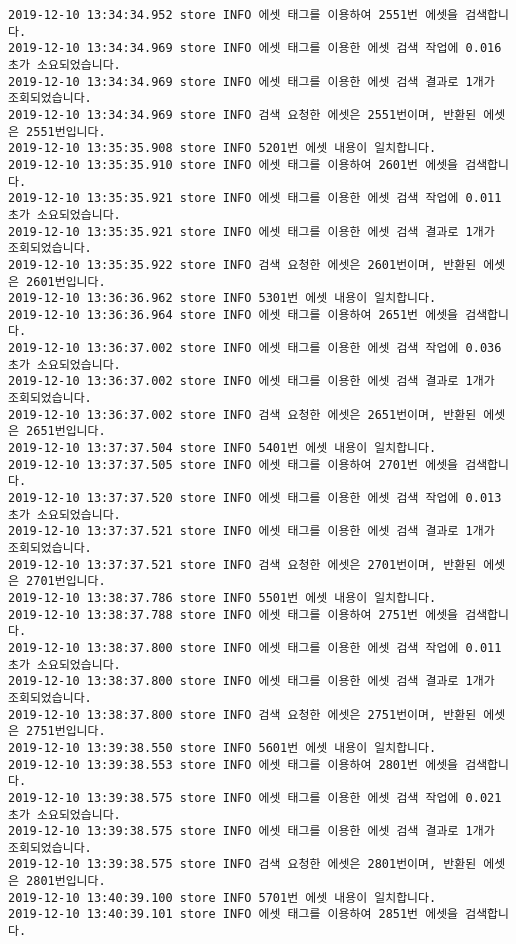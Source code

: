 \begin{Verbatim}[fontsize=\tiny, breaklines=true, breakanywhere=true]
2019-12-10 13:34:34.952 store INFO 에셋 태그를 이용하여 2551번 에셋을 검색합니다.
2019-12-10 13:34:34.969 store INFO 에셋 태그를 이용한 에셋 검색 작업에 0.016초가 소요되었습니다.
2019-12-10 13:34:34.969 store INFO 에셋 태그를 이용한 에셋 검색 결과로 1개가 조회되었습니다.
2019-12-10 13:34:34.969 store INFO 검색 요청한 에셋은 2551번이며, 반환된 에셋은 2551번입니다.
2019-12-10 13:35:35.908 store INFO 5201번 에셋 내용이 일치합니다.
2019-12-10 13:35:35.910 store INFO 에셋 태그를 이용하여 2601번 에셋을 검색합니다.
2019-12-10 13:35:35.921 store INFO 에셋 태그를 이용한 에셋 검색 작업에 0.011초가 소요되었습니다.
2019-12-10 13:35:35.921 store INFO 에셋 태그를 이용한 에셋 검색 결과로 1개가 조회되었습니다.
2019-12-10 13:35:35.922 store INFO 검색 요청한 에셋은 2601번이며, 반환된 에셋은 2601번입니다.
2019-12-10 13:36:36.962 store INFO 5301번 에셋 내용이 일치합니다.
2019-12-10 13:36:36.964 store INFO 에셋 태그를 이용하여 2651번 에셋을 검색합니다.
2019-12-10 13:36:37.002 store INFO 에셋 태그를 이용한 에셋 검색 작업에 0.036초가 소요되었습니다.
2019-12-10 13:36:37.002 store INFO 에셋 태그를 이용한 에셋 검색 결과로 1개가 조회되었습니다.
2019-12-10 13:36:37.002 store INFO 검색 요청한 에셋은 2651번이며, 반환된 에셋은 2651번입니다.
2019-12-10 13:37:37.504 store INFO 5401번 에셋 내용이 일치합니다.
2019-12-10 13:37:37.505 store INFO 에셋 태그를 이용하여 2701번 에셋을 검색합니다.
2019-12-10 13:37:37.520 store INFO 에셋 태그를 이용한 에셋 검색 작업에 0.013초가 소요되었습니다.
2019-12-10 13:37:37.521 store INFO 에셋 태그를 이용한 에셋 검색 결과로 1개가 조회되었습니다.
2019-12-10 13:37:37.521 store INFO 검색 요청한 에셋은 2701번이며, 반환된 에셋은 2701번입니다.
2019-12-10 13:38:37.786 store INFO 5501번 에셋 내용이 일치합니다.
2019-12-10 13:38:37.788 store INFO 에셋 태그를 이용하여 2751번 에셋을 검색합니다.
2019-12-10 13:38:37.800 store INFO 에셋 태그를 이용한 에셋 검색 작업에 0.011초가 소요되었습니다.
2019-12-10 13:38:37.800 store INFO 에셋 태그를 이용한 에셋 검색 결과로 1개가 조회되었습니다.
2019-12-10 13:38:37.800 store INFO 검색 요청한 에셋은 2751번이며, 반환된 에셋은 2751번입니다.
2019-12-10 13:39:38.550 store INFO 5601번 에셋 내용이 일치합니다.
2019-12-10 13:39:38.553 store INFO 에셋 태그를 이용하여 2801번 에셋을 검색합니다.
2019-12-10 13:39:38.575 store INFO 에셋 태그를 이용한 에셋 검색 작업에 0.021초가 소요되었습니다.
2019-12-10 13:39:38.575 store INFO 에셋 태그를 이용한 에셋 검색 결과로 1개가 조회되었습니다.
2019-12-10 13:39:38.575 store INFO 검색 요청한 에셋은 2801번이며, 반환된 에셋은 2801번입니다.
2019-12-10 13:40:39.100 store INFO 5701번 에셋 내용이 일치합니다.
2019-12-10 13:40:39.101 store INFO 에셋 태그를 이용하여 2851번 에셋을 검색합니다.

\end{Verbatim}
